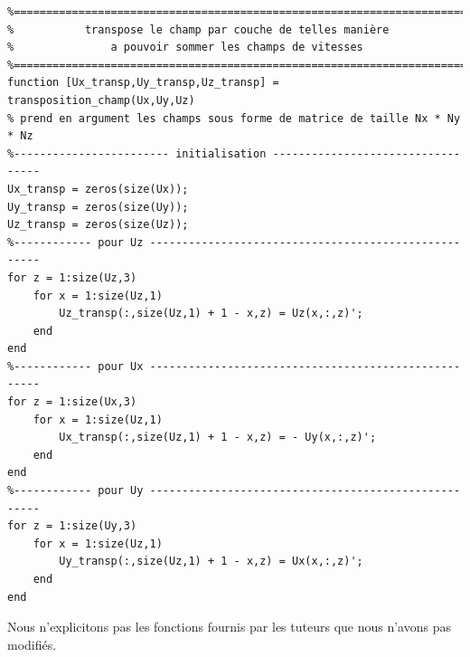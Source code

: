 \documentclass[a4paper,12pt,titlepage]{report}
\begin{document}
\begin{onehalfspace}
\begin{appendix}
\begin{verbatim}
%==========================================================================
%           transpose le champ par couche de telles manière 
%               a pouvoir sommer les champs de vitesses
%==========================================================================
function [Ux_transp,Uy_transp,Uz_transp] = transposition_champ(Ux,Uy,Uz)
% prend en argument les champs sous forme de matrice de taille Nx * Ny * Nz
%------------------------ initialisation ----------------------------------
Ux_transp = zeros(size(Ux));
Uy_transp = zeros(size(Uy));
Uz_transp = zeros(size(Uz));
%------------ pour Uz -----------------------------------------------------
for z = 1:size(Uz,3)
    for x = 1:size(Uz,1)
        Uz_transp(:,size(Uz,1) + 1 - x,z) = Uz(x,:,z)'; 
    end
end
%------------ pour Ux -----------------------------------------------------
for z = 1:size(Ux,3)
    for x = 1:size(Uz,1)
        Ux_transp(:,size(Uz,1) + 1 - x,z) = - Uy(x,:,z)'; 
    end
end
%------------ pour Uy -----------------------------------------------------
for z = 1:size(Uy,3)
    for x = 1:size(Uz,1)
        Uy_transp(:,size(Uz,1) + 1 - x,z) = Ux(x,:,z)'; 
    end
end
\end{verbatim}
Nous n'explicitons pas les fonctions fournis par les tuteurs que nous n'avons pas modifiés.
\iffalse

\end{appendix}
\end{onehalfspace}
\end{document}
